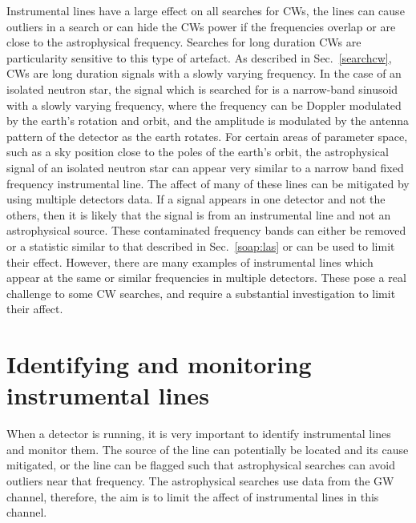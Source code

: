 %

Instrumental lines have a large effect on all searches for \glspl{CW}, the lines can cause outliers in a search or can hide the \glspl{CW} power if the frequencies overlap or are close to the astrophysical frequency.
Searches for long duration \glspl{CW} are particularity sensitive to this type of artefact.  As described in
Sec.~\ref{searchcw}, \glspl{CW} are long duration signals with a slowly varying
frequency.  In the case of an isolated neutron star, the signal which is
searched for is a narrow-band sinusoid with a slowly varying frequency, where the frequency can be Doppler modulated by
the earth's rotation and orbit, and the amplitude is modulated by the antenna pattern of the detector as the earth rotates. For certain areas of parameter space, such as a sky position
close to the poles of the earth's orbit, the astrophysical signal of an isolated neutron star can
appear very similar to a narrow band fixed frequency instrumental line. The affect of many of these lines can be mitigated by using multiple detectors data. If a signal
appears in one detector and not the others, then it is likely that the signal
is from an instrumental line and not an astrophysical source.  These
contaminated frequency bands can either be removed or a statistic similar to
that described in Sec.~\ref{soap:las} or \citep{keitel2014SearchContinuous} can
be used to limit their effect.  However, there are many examples of
instrumental lines which appear at the same or similar frequencies in multiple
detectors.  These pose a real challenge to some \gls{CW} searches, and require
a substantial investigation to limit their affect.

\section{\label{detchar:monitor}Identifying and monitoring instrumental lines}
%

When a detector is running, it is very important to identify instrumental lines
and monitor them.  The source of the line can potentially be located and its cause mitigated, or the line can be flagged such that astrophysical searches can avoid outliers near that frequency.  
The astrophysical searches use data from the \gls{GW} channel, therefore, the aim is to limit the affect of instrumental lines in this channel.

